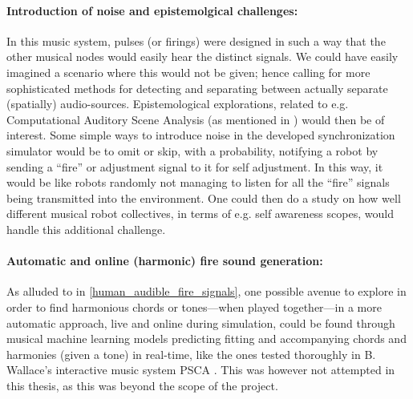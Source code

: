 	\paragraph{Introduction of noise and epistemolgical challenges:}
	In this music system, pulses (or firings) were designed in such a way that the other musical nodes would easily hear the distinct signals. We could have easily imagined a scenario where this would not be given; hence calling for more sophisticated methods for detecting and separating between actually separate (spatially) audio-sources. Epistemological explorations, related to e.g. Computational Auditory Scene Analysis (as mentioned in \cite{casa}) would then be of interest. Some simple ways to introduce noise in the developed synchronization simulator would be to omit or skip, with a probability, notifying a robot by sending a ``fire'' or adjustment signal to it for self adjustment. In this way, it would be like robots randomly not managing to listen for all the ``fire'' signals being transmitted into the environment. One could then do a study on how well different musical robot collectives, in terms of e.g. self awareness scopes, would handle this additional challenge.
	
	

	\paragraph{Automatic and online (harmonic) fire sound generation:}
	As alluded to in \ref{human_audible_fire_signals}, one possible avenue to explore in order to find harmonious chords or tones—when played together—in a more automatic approach, live and online during simulation, could be found through musical machine learning models predicting fitting and accompanying chords and harmonies (given a tone) in real-time, like the ones tested thoroughly in B. Wallace's interactive music system PSCA \cite{wallace_PSCA}. This was however not attempted in this thesis, as this was beyond the scope of the project.

